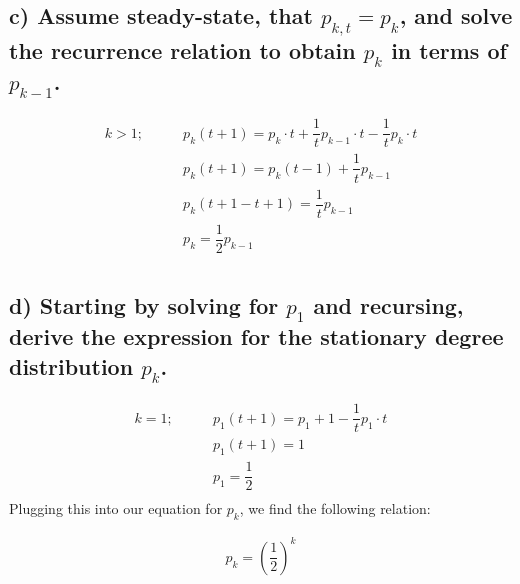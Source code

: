 \documentclass{tufte-handout}
\begin{document}
\subsection{c)
Assume steady-state, that $p_{k,t} = p_{k}$, and solve the recurrence relation to obtain $p_k$ in terms of $p_{k-1}$.}

\begin{align*}
k > 1; \hspace{2em} & p_{k} (t+1) = p_{k} \cdot t + \dfrac{1}{t} p_{k-1} \cdot{t} - \dfrac{1}{t} p_{k} \cdot{t} \\
                    & p_{k} (t+1) = p_{k} (t - 1) + \dfrac{1}{t} p_{k-1} \\
                    & p_{k} (t+1-t+1) = \dfrac{1}{t} p_{k-1} \\
                    & p_{k} = \dfrac{1}{2} p_{k-1} \\
\end{align*}

\subsection{d) Starting by solving for $p_1$ and recursing, derive the expression for the stationary degree distribution $p_k$.}
\begin{align*}
k = 1; \hspace{2em} & p_{1} (t+1) = p_{1} + 1 - \dfrac{1}{t} p_{1} \cdot t \\
                    & p_{1} (t+1) = 1 \\
                    & p_{1} = \dfrac{1}{2} \\
\end{align*}
Plugging this into our equation for $p_{k}$, we find the following relation:

\begin{align*}
p_{k} = \left( \dfrac{1}{2} \right)^k
\end{align*}




\end{document}
